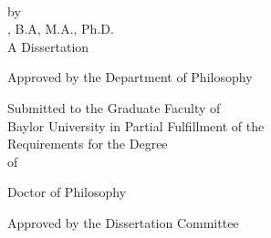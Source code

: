 \thispagestyle{empty}
\begin{center}
    \begin{singlespacing}
    \mytitle{}\\            %
    \end{singlespacing}

    by\\
    
    \myname{}, B.A, M.A., Ph.D.\\ %

    A Dissertation
    
    Approved by the Department of Philosophy
    

\begin{singlespacing}
    Submitted to the Graduate Faculty of\\
    
    Baylor University in Partial Fulfillment of the\\
    
    Requirements for the Degree\\
    
    of\\
    
\end{singlespacing}

    Doctor of Philosophy\\ %
\end{center}

\vspace{0.25in} %

\begin{minipage}{3.625in}
\begin{center}
Approved by the Dissertation Committee


\vspace{-.175in}


\vspace{-.175in}


\vspace{-.175in}


\vspace{-.175in}

{\color{white} } %
\end{center}
\end{minipage}

